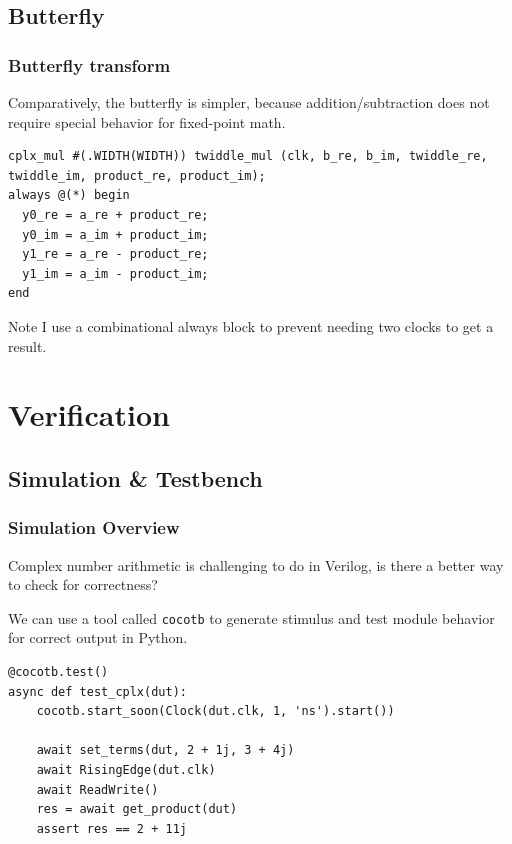 \documentclass{beamer}
\begin{document}
\subsection{Butterfly}
\begin{frame}[fragile]
	\frametitle{Butterfly transform}
	Comparatively, the butterfly is simpler, because addition/subtraction does not require
	special behavior for fixed-point math.
\begin{verbatim}
cplx_mul #(.WIDTH(WIDTH)) twiddle_mul (clk, b_re, b_im, twiddle_re, twiddle_im, product_re, product_im);
always @(*) begin
  y0_re = a_re + product_re;
  y0_im = a_im + product_im;
  y1_re = a_re - product_re;
  y1_im = a_im - product_im;
end
\end{verbatim}
\begin{block}{Note}
I use a combinational always block to prevent needing two clocks to get a result.
\end{block}
\end{frame}

\section{Verification}

\subsection{Simulation \& Testbench}
\begin{frame}[fragile]
	\frametitle{Simulation Overview}
	Complex number arithmetic is challenging to do in Verilog, is there a better way
	to check for correctness?

	\pause
	 We can use a tool called \texttt{cocotb} to generate stimulus and
	test module behavior for correct output in Python.

	\pause
\begin{verbatim}
@cocotb.test()
async def test_cplx(dut):
    cocotb.start_soon(Clock(dut.clk, 1, 'ns').start())

    await set_terms(dut, 2 + 1j, 3 + 4j)
    await RisingEdge(dut.clk)
    await ReadWrite()
    res = await get_product(dut)
    assert res == 2 + 11j
\end{verbatim}
\end{frame}
\end{document}
